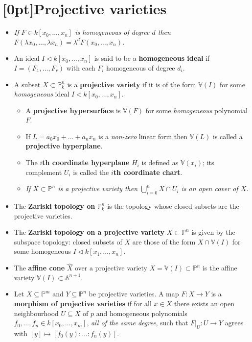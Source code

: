 \documentclass[10pt]{article}
\newcommand{\van}{\mathbb{V}}
\newcommand{\aff}{\mathbb{A}}
\newcommand{\kon}{{k[x_1,\ldots,x_n]}}
\newcommand{\kzn}{{k[x_0,\ldots,x_n]}}
\newcommand{\kzm}{{k[x_0,\ldots,x_m]}}
\newcommand{\pee}{\mathbb{P}}
\newcommand{\AG}{\textcolor{green}{AG}}
\begin{document}
    \section{\protect\marginnote{\AG}[0pt]Projective varieties}

        \begin{itemize}
            \item \emph{If $F\in\kzn$ is homogeneous of degree $d$ then $F(\lambda x_0,\ldots,\lambda x_n)=\lambda^d F(x_0,\ldots,x_n)$.}
            \item An ideal $I\triangleleft\kzn$ is said to be a \textbf{homogeneous ideal} if $I=(F_1,\ldots,F_r)$ with each $F_i$ homogeneous of degree $d_i$.
            \item A subset $X\subset\pee_k^n$ is a \textbf{projective variety} if it is of the form $\van(I)$ for some \emph{homogeneous} ideal $I\triangleleft\kzn$.
                \begin{itemize}
                    \item A \textbf{projective hypersurface} is $\van(F)$ for some \emph{homogeneous} polynomial $F$.
                    \item If $L=a_0x_0+\ldots+a_nx_n$ is a \emph{non-zero} linear form then $\van(L)$ is called a \textbf{projective hyperplane}.
                    \item The \textbf{$i$th coordinate hyperplane} $H_i$ is defined as $\van(x_i)$; its complement $U_i$ is called the \textbf{$i$th coordinate chart}.
                    \item \emph{If $X\subset\pee^n$ is a projective variety then $\bigcup_{i=0}^nX\cap U_i$ is an open cover of $X$.}
                \end{itemize}
            \item The \textbf{Zariski topology on} $\pee_k^n$ is the topology whose closed subsets are the projective varieties.
            \item The \textbf{Zariski topology on a projective variety} $X\subset \pee^n$ is given by the subspace topology: closed subsets of $X$ are those of the form $X\cap\van(I)$ for some homogeneous $I\triangleleft\kon$.
            \item The \textbf{affine cone} $\widehat{X}$ over a projective variety $X=\van(I)\subset\pee^n$ is the affine variety $\van(I)\subset\aff^{n+1}$.
            \item Let $X\subseteq\pee^m$ and $Y\subseteq\pee^n$ be projective varieties.
                A map $F\colon X\to Y$ is a \textbf{morphism of projective varieties} if for all $x\in X$ there exists an open neighbourhood $U\subseteq X$ of $p$ and homogeneous polynomials $f_0,\ldots,f_n\in\kzm$, \emph{all of the same degree}, such that $F|_U\colon U\to Y$ agrees with $[y]\mapsto[f_0(y):\ldots:f_n(y)]$.

\end{itemize}
\end{document}
